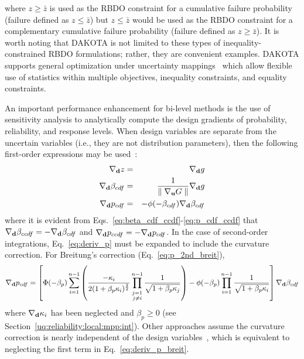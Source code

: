 \noindent where $z \ge \bar{z}$ is used as the RBDO constraint for 
a cumulative failure probability (failure defined as $z \le \bar{z}$)
but $z \le \bar{z}$ would be used as the RBDO constraint for a
complementary cumulative failure probability (failure defined as $z
\ge \bar{z}$).  It is worth noting that DAKOTA is not limited to these
types of inequality-constrained RBDO formulations; rather, they are
convenient examples.  DAKOTA supports general optimization under
uncertainty mappings~\cite{Eld02} which allow flexible use of
statistics within multiple objectives, inequality constraints, and
equality constraints.

An important performance enhancement for bi-level methods is the use
of sensitivity analysis to analytically compute the design gradients
of probability, reliability, and response levels.  When design
variables are separate from the uncertain variables (i.e., they are
not distribution parameters), then the following first-order 
expressions may be used~\cite{Hoh86,Kar92,All04}:
\begin{eqnarray}
\nabla_{\bf d} z           & = & \nabla_{\bf d} g \label{eq:deriv_z} \\
\nabla_{\bf d} \beta_{cdf} & = & \frac{1}{{\parallel \nabla_{\bf u} G 
\parallel}} \nabla_{\bf d} g \label{eq:deriv_beta} \\
\nabla_{\bf d} p_{cdf}     & = & -\phi(-\beta_{cdf}) \nabla_{\bf d} \beta_{cdf}
\label{eq:deriv_p}
\end{eqnarray}
where it is evident from Eqs.~\ref{eq:beta_cdf_ccdf}-\ref{eq:p_cdf_ccdf} 
that $\nabla_{\bf d} \beta_{ccdf} = -\nabla_{\bf d} \beta_{cdf}$ and 
$\nabla_{\bf d} p_{ccdf} = -\nabla_{\bf d} p_{cdf}$.  In the case of 
second-order integrations, Eq.~\ref{eq:deriv_p} must be expanded to 
include the curvature correction.  For Breitung's correction 
(Eq.~\ref{eq:p_2nd_breit}),
\begin{equation}
\nabla_{\bf d} p_{cdf} = \left[ \Phi(-\beta_p) \sum_{i=1}^{n-1} 
\left( \frac{-\kappa_i}{2 (1 + \beta_p \kappa_i)^{\frac{3}{2}}}
\prod_{\stackrel{\scriptstyle j=1}{j \ne i}}^{n-1} 
\frac{1}{\sqrt{1 + \beta_p \kappa_j}} \right) - 
\phi(-\beta_p) \prod_{i=1}^{n-1} \frac{1}{\sqrt{1 + \beta_p \kappa_i}} 
\right] \nabla_{\bf d} \beta_{cdf} \label{eq:deriv_p_breit}
\end{equation}
where $\nabla_{\bf d} \kappa_i$ has been neglected and $\beta_p \ge 0$
(see Section~\ref{uq:reliability:local:mpp:int}).  Other approaches assume
the curvature correction is nearly independent of the design
variables~\cite{Rac02}, which is equivalent to neglecting the first
term in Eq.~\ref{eq:deriv_p_breit}.

